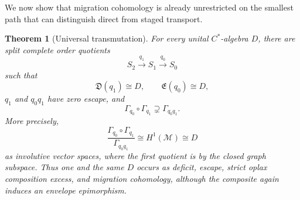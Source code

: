 \documentclass[11pt,a4paper]{amsart}
\theoremstyle{plain}
\newtheorem{theorem}{Theorem}[section]
\theoremstyle{definition}
\newcommand{\Esc}{\mathfrak E}
\newcommand{\Def}{\mathfrak D}
\begin{document}
We now show that migration cohomology is already unrestricted on the smallest path that can
distinguish direct from staged transport.

\begin{theorem}[Universal transmutation]\label{thm:realization}
For every unital $C^*$-algebra $D$, there are split complete order quotients
\[
 S_2\xrightarrow{q_1}S_1\xrightarrow{q_0}S_0
\]
such that
\[
 \Def(q_1)\cong D,\qquad \Esc(q_0)\cong D,
\]
$q_1$ and $q_0q_1$ have zero escape, and
\[
 \Gamma_{q_0}\circ\Gamma_{q_1}\supsetneq\Gamma_{q_0q_1}.
\]
More precisely,
\[
 \frac{\Gamma_{q_0}\circ\Gamma_{q_1}}{\Gamma_{q_0q_1}}
 \cong H^1(\mathcal M)\cong D
\]
as involutive vector spaces, where the first quotient is by the closed graph subspace.  Thus one
and the same $D$ occurs as deficit, escape, strict oplax composition excess, and migration
cohomology, although the composite again induces an envelope epimorphism.
\end{theorem}
\end{document}
